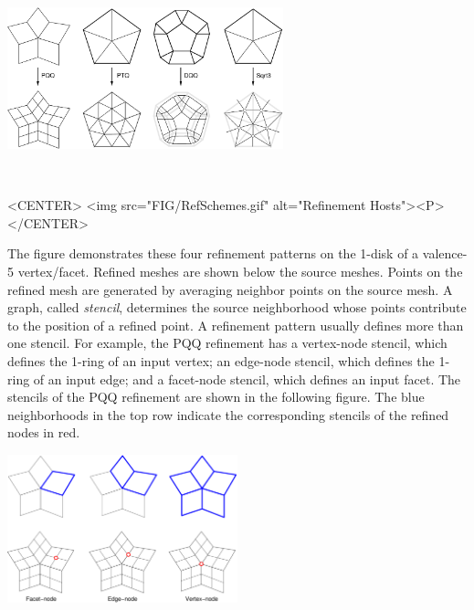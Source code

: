 \begin{ccTexOnly}
  \begin{center}
    \parbox{0.6\textwidth}{%
      \includegraphics[width=0.6\textwidth]{Subdivision_method_3/FIG/RefSchemes}%
    }\\ \vspace{0.5cm}
  \end{center}
\end{ccTexOnly}

\begin{ccHtmlOnly}
  <CENTER>
     <img src="FIG/RefSchemes.gif" alt="Refinement Hosts"><P>
  </CENTER>
\end{ccHtmlOnly}

The figure demonstrates these four refinement patterns on 
the 1-disk of a valence-5 vertex/facet.
Refined meshes are shown below the source meshes. 
Points on the refined mesh are generated by averaging
neighbor points on the source mesh. A graph, called \emph{stencil}, 
determines the source neighborhood whose points contribute to the 
position of a refined point. A refinement pattern usually defines 
more than one stencil.
For example, the PQQ
refinement has a vertex-node stencil, 
which defines the 1-ring of an input vertex; an edge-node stencil, 
which defines the 1-ring of an input edge; and a facet-node stencil, 
which defines an input facet. The stencils of the PQQ refinement are
shown in the following figure. The blue neighborhoods in the 
top row indicate the corresponding stencils of the refined nodes 
in red. 

\begin{ccTexOnly}
  \begin{center}
    \parbox{0.5\textwidth}{%
      \includegraphics[width=0.5\textwidth]{Subdivision_method_3/FIG/PQQStencil}%
    }\\ \vspace{0.5cm}
  \end{center}
\end{ccTexOnly}

